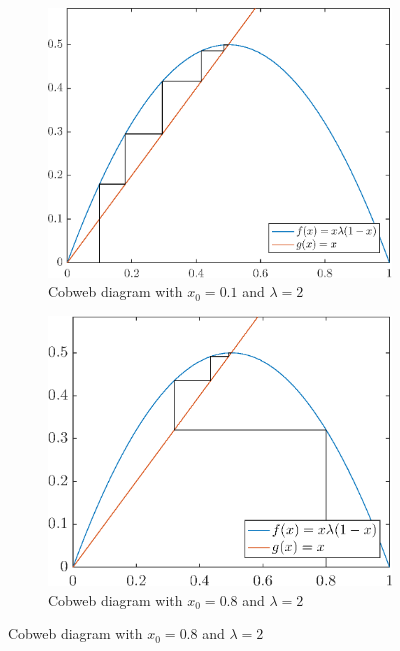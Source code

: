 \documentclass[12pt,oneside,a4paper]{article}
\numberwithin{equation}{section}
\begin{document}
{{{{\begin{figure}[h]
	\centering
	\begin{subfigure}{0.45\textwidth}
		\includegraphics[width=\linewidth]{cobweb_x1_l20_iter50}
		\caption{Cobweb diagram with $x_0=0.1$ and $\lambda=2$}
		\label{cobx1l20}
	\end{subfigure}\hfill
	\begin{subfigure}{.45\textwidth}
		\centering
		\includegraphics[width=\linewidth]{cobweb_x8_l20_iter50}
		\caption{Cobweb diagram with $x_0=0.8$ and $\lambda=2$}
		\label{cobx8l20}
	\end{subfigure}
\end{figure}

}}}}
\end{document}
